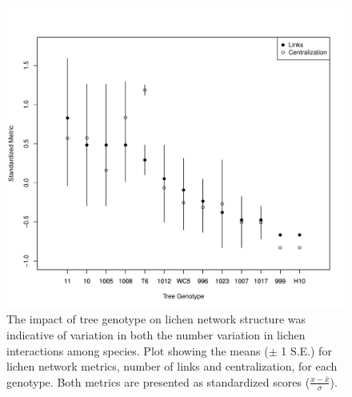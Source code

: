 \documentclass[9pt,twocolumn,twoside,lineno]{pnas-new}
\begin{document}
{\begin{figure}[ht]
\centering
\includegraphics[width=\linewidth]{cn_metrics.pdf}
\caption{The impact of tree genotype on lichen network structure was
  indicative of variation in both the number variation in lichen
  interactions among species. Plot showing the means ($\pm$ 1 S.E.)
  for lichen network metrics, number of links and centralization, for
  each genotype. Both metrics are presented as standardized scores
  ($\frac{x - \bar{x}}{\sigma}$).}
\label{fig:cn_metrics}
\end{figure}




}
\end{document}
